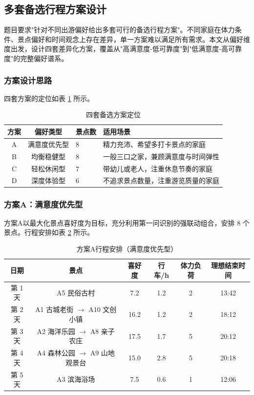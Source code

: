 
\subsection{多套备选行程方案设计}

题目要求"针对不同出游偏好给出多套可行的备选行程方案"。不同家庭在体力条件、景点偏好和时间观念上存在差异，单一方案难以满足所有需求。本文从偏好维度出发，设计四套差异化方案，覆盖从"高满意度-低可靠度"到"低满意度-高可靠度"的完整偏好谱系。

\subsubsection{方案设计思路}

四套方案的定位如表 \ref{tab:plan_types} 所示。

\begin{table}[H]
\centering
\caption{四套备选方案定位}
\label{tab:plan_types}
\begin{tabularx}{\textwidth}{cclX}
\toprule
方案 & 偏好类型 & 景点数 & 适用场景 \\
\midrule
A & 满意度优先型 & 8 & 精力充沛、希望多打卡景点的家庭 \\
B & 均衡稳健型 & 8 & 一般三口之家，兼顾满意度与时间弹性 \\
C & 轻松休闲型 & 7 & 带幼儿或老人，注重休息节奏的家庭 \\
D & 深度体验型 & 6 & 不追求景点数量，注重游览质量的家庭 \\
\bottomrule
\end{tabularx}
\end{table}

\subsubsection{方案A：满意度优先型}

方案A以最大化景点喜好度为目标，充分利用第一问识别的强联动组合，安排 8 个景点。行程安排如表 \ref{tab:planA} 所示。

\begin{table}[H]
\centering
\caption{方案A行程安排（满意度优先型）}
\label{tab:planA}
\begin{tabular}{cccccc}
\toprule
日期 & 景点 & 喜好度 & 行车/h & 体力负荷 & 理想结束时间 \\
\midrule
第 1 天 & A5 民俗古村 & 7.2 & 1.2 & 2 & 13:42 \\
第 2 天 & A1 古城老街 $\rightarrow$ A10 文创小镇 & 16.2 & 1.2 & 2 & 18:12 \\
第 3 天 & A2 海洋乐园 $\rightarrow$ A8 亲子农庄 & 17.5 & 1.7 & 5 & 20:12 \\
第 4 天 & A4 森林公园 $\rightarrow$ A9 山地观景台 & 15.0 & 2.8 & 5 & 20:18 \\
第 5 天 & A3 滨海浴场 & 7.5 & 0.6 & 1 & 12:06 \\
\bottomrule
\end{tabular}
\end{table}

